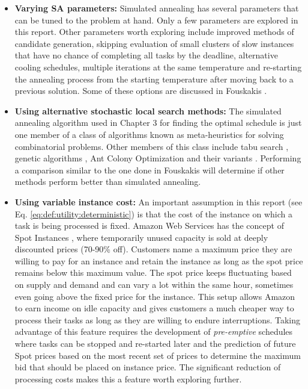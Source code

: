 \documentclass[12pt]{report}
\begin{document}
\begin{itemize}

	\item \textbf{Varying SA parameters:} Simulated annealing has several parameters that can be tuned to the problem at hand.
	Only a few parameters are explored in this report.
	Other parameters worth exploring include improved methods of candidate generation, skipping evaluation of small clusters of slow instances that have no chance of completing all tasks by the deadline, alternative cooling schedules, multiple iterations at the same temperature and re-starting the annealing process from the starting temperature after moving back to a previous solution. 
	Some of these options are discussed in Fouskakis \cite{Fouskakis2001}.
	
	\item \textbf{Using alternative stochastic local search methods:} 
	The simulated annealing algorithm \cite{Kirkpatrick1983} used in Chapter 3 for finding the optimal schedule is just one member of a class of algorithms known as meta-heuristics for solving combinatorial problems.
	Other members of this class include tabu search \cite{Glover1989, Glover1990}, genetic algorithms \cite{Holland1992}, Ant Colony Optimization \cite{Dorigo2006} and their variants \cite{Hoos2004}.
	Performing a comparison similar to the one done in Fouskakis \cite{Fouskakis2001} will determine if other methods perform better than simulated annealing.
	
	\item \textbf{Using variable instance cost:} An important assumption in this report (see Eq. \ref{eq:def:utility:deterministic}) is that the cost of the instance on which a task is being processed is fixed.
		Amazon Web Services has the concept of Spot Instances \cite{AWS:Spot}, where temporarily unused capacity is sold at deeply discounted prices (70-90\% off). 
		Customers name a maximum price they are willing to pay for an instance and retain the instance as long as the spot price remains below this maximum value.
		The spot price keeps fluctuating based on supply and demand and can vary a lot within the same hour, sometimes even going above the fixed price for the instance.
		This setup allows Amazon to earn income on idle capacity and gives customers a much cheaper way to process their tasks as long as they are willing to endure interruptions.
		Taking advantage of this feature requires the development of \textit{pre-emptive} schedules where tasks can be stopped and re-started later and the prediction of future Spot prices based on the most recent set of prices to determine the maximum bid that should be placed on instance price.
		The significant reduction of processing costs makes this a feature worth exploring further.
	
\end{itemize}


\newpage
\sloppy
\printbibliography

\appendix

\end{document}
